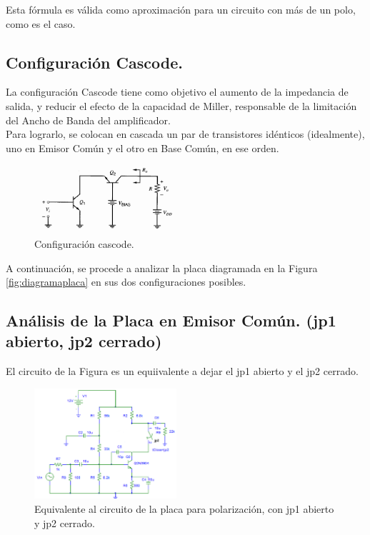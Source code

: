\documentclass[letterpaper, 10 pt, conference]{ieeeconf}  %
\begin{document}
Esta fórmula es válida como aproximación para un circuito con más de un polo, como es el caso.

\subsection{\textbf{Configuración Cascode.}}

La configuración Cascode tiene como objetivo el aumento de la impedancia de salida, y reducir el efecto de la capacidad de Miller, responsable de la limitación del Ancho de Banda del amplificador.\\
Para lograrlo, se colocan en cascada un par de transistores idénticos (idealmente), uno en Emisor Común y el otro en Base Común, en ese orden.

\begin{figure}[H]
  \centering
  \includegraphics[width=0.47\textwidth]{imagenes/cascode basico.png}
  \caption{Configuración cascode.}
  \label{fig:cascode}
\end{figure}

A continuación, se procede a analizar la placa diagramada en la Figura \ref{fig:diagramaplaca} en sus dos configuraciones posibles.

\subsection{\textbf{Análisis de la Placa en Emisor Común. (jp1 abierto, jp2 cerrado)}}

El circuito de la Figura es un equiivalente a dejar el jp1 abierto y el jp2 cerrado.

\begin{figure}[H]
  \centering
  \includegraphics[width=0.47\textwidth]{imagenes/diagrama polarizacion ec.png}
  \caption{Equivalente al circuito de la placa para polarización, con jp1 abierto y jp2 cerrado.}
  \label{fig:pola_ec}
\end{figure}
\end{document}
